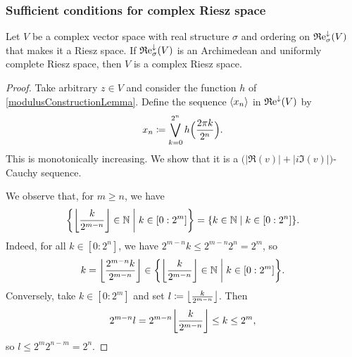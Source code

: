 \subsubsection{Sufficient conditions for complex Riesz space}
\begin{proposition}
Let $V$ be a complex vector space with real structure $\sigma$ and ordering on $\Re^\imf_\sigma(V)$ that makes it a Riesz space. If $\Re^\imf_\sigma(V)$ is an Archimedean and uniformly complete Riesz space, then $V$ is a complex Riesz space.
\end{proposition}
\begin{proof}
Take arbitrary $z\in V$ and consider the function $h$ of \ref{modulusConstructionLemma}.
Define the sequence $\seq{x_n}$ in $\Re^\imf(V)$ by
\[ x_n \defeq \bigvee_{k=0}^{2^n} h\Big(\frac{2\pi k}{2^n}\Big). \]
This is monotonically increasing. We show that it is a $\big(|\Re(v)| + |i\Im(v)|\big)$-Cauchy sequence.

We observe that, for $m\geq n$, we have
\[ \setbuilder{\floor*{\frac{k}{2^{m-n}}}\in \N}{k\in [0:2^m]} = \setbuilder{k\in \N}{k\in [0:2^n]}. \]
Indeed, for all $k\in [0:2^n]$, we have $2^{m-n}k \leq 2^{m-n}2^n = 2^m$, so
\[ k = \floor*{\frac{2^{m-n}k}{2^{m-n}}} \in \setbuilder{\floor*{\frac{k}{2^{m-n}}}\in \N}{k\in [0:2^m]}. \]
Conversely, take $k \in [0:2^m]$ and set $l \defeq \floor*{\frac{k}{2^{m-n}}}$. Then
\[ 2^{m-n}l = 2^{m-n}\floor*{\frac{k}{2^{m-n}}} \leq k \leq 2^m, \]
so $l \leq 2^m2^{n-m} = 2^n$.


\end{proof}
